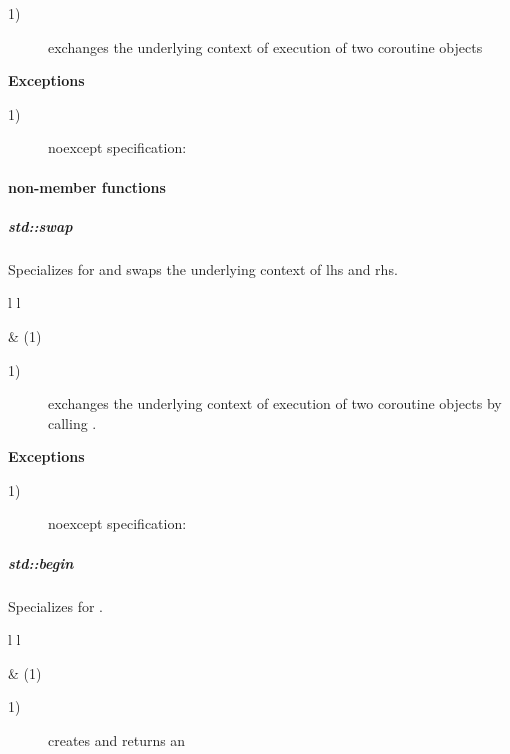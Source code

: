 \begin{description}
    \item[1)] exchanges the underlying context of execution of two coroutine objects
\end{description}

{\bf Exceptions}
\begin{description}
    \item[1)] noexcept specification: 
\end{description}

\paragraph*{non-member functions}
\subparagraph*{std::swap}
Specializes  for \pushcoro and swaps the underlying context of
lhs and rhs.

\begin{tabular}{ l l }
    \midrule

     & (1)\\

    \midrule
\end{tabular}

\begin{description}
    \item[1)] exchanges the underlying context of execution of two coroutine
              objects by calling . 
\end{description}

{\bf Exceptions}
\begin{description}
    \item[1)] noexcept specification: 
\end{description}

\subparagraph*{std::begin}
Specializes  for \pushcoro.

\begin{tabular}{ l l }
    \midrule

     & (1)\\

    \midrule
\end{tabular}

\begin{description}
    \item[1)] creates and returns an 
\end{description}

